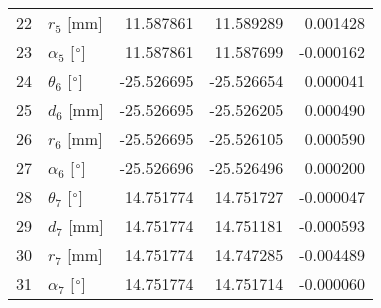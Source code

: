 \documentclass{standalone}%
\begin{document}
\begin{tabular}{llrrr}
22 &              $r_{5}$ [mm] &  11.587861 &  11.589289 &   0.001428 \\
23 &  $\alpha_{5}$ [$\degree$] &  11.587861 &  11.587699 &  -0.000162 \\
24 &  $\theta_{6}$ [$\degree$] & -25.526695 & -25.526654 &   0.000041 \\
25 &              $d_{6}$ [mm] & -25.526695 & -25.526205 &   0.000490 \\
26 &              $r_{6}$ [mm] & -25.526695 & -25.526105 &   0.000590 \\
27 &  $\alpha_{6}$ [$\degree$] & -25.526696 & -25.526496 &   0.000200 \\
28 &  $\theta_{7}$ [$\degree$] &  14.751774 &  14.751727 &  -0.000047 \\
29 &              $d_{7}$ [mm] &  14.751774 &  14.751181 &  -0.000593 \\
30 &              $r_{7}$ [mm] &  14.751774 &  14.747285 &  -0.004489 \\
31 &  $\alpha_{7}$ [$\degree$] &  14.751774 &  14.751714 &  -0.000060 \\
\bottomrule
\end{tabular}
%
\end{document}
